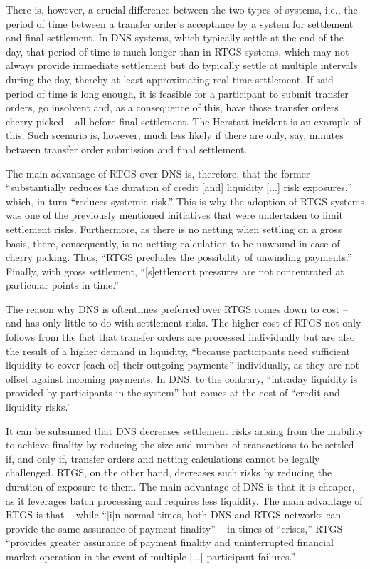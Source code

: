 There is, however, a crucial difference between the two types of systems, i.e., the period of time between a transfer order's acceptance by a system for settlement and final settlement.
In DNS systems, which typically settle at the end of the day, that period of time is much longer than in RTGS systems, which may not always provide immediate settlement but do typically settle at multiple intervals during the day, thereby at least approximating real-time settlement.
If said period of time is long enough, it is feasible for a participant to submit transfer orders, go insolvent and, as a consequence of this, have those transfer orders cherry-picked -- all before final settlement.
The Herstatt incident is an example of this.
Such scenario is, however, much less likely if there are only, say, minutes between transfer order submission and final settlement.

The main advantage of RTGS over DNS is, therefore, that the former ``substantially reduces the duration of credit [and] liquidity [...] risk exposures,'' which, in turn ``reduces systemic risk.'' \autocite[43]{vereecken2003}
This is why the adoption of RTGS systems was one of the previously mentioned initiatives  that were undertaken to limit settlement risks.
Furthermore, as there is no netting when settling on a gross basis, there, consequently, is no netting calculation to be unwound in case of cherry picking.
Thus, ``RTGS precludes the possibility of unwinding payments.'' \autocite[43]{vereecken2003}
Finally, with gross settlement, ``[s]ettlement pressures are not concentrated at particular points in time.'' \autocite[43]{vereecken2003}

The reason why DNS is oftentimes preferred over RTGS comes down to cost -- and has only little to do with settlement risks.
The higher cost of RTGS not only follows from the fact that transfer orders are processed individually but are also the result of a higher demand in liquidity, ``because participants need sufficient liquidity to cover [each of] their outgoing payments'' \autocite[26]{cpmi2001} individually, as they are not offset against incoming payments.
In DNS, to the contrary, ``intraday liquidity is provided by participants in the system'' but comes at the cost of ``credit and liquidity risks.'' \autocite[26]{cpmi2001}

It can be subsumed that DNS decreases settlement risks arising from the inability to achieve finality by reducing the size and number of transactions to be settled -- if, and only if, transfer orders and netting calculations cannot be legally challenged.
RTGS, on the other hand, decreases such risks by reducing the duration of exposure to them.
The main advantage of DNS is that it is cheaper, as it leverages batch processing and requires less liquidity.
The main advantage of RTGS is that -- while ``[i]n normal times, both DNS and RTGS networks can provide the same assurance of payment finality'' -- in times of ``crises,'' RTGS ``provides greater assurance of payment finality and uninterrupted financial market operation in the event of multiple [...] participant failures.'' \autocite[5]{pages2005}

